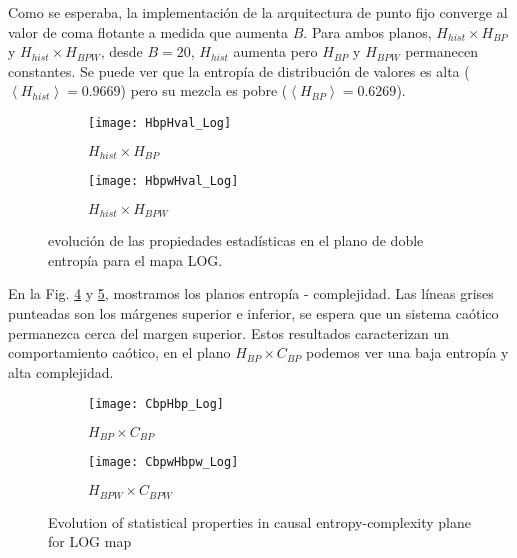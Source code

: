 Como se esperaba, la implementación de la arquitectura de punto fijo converge al valor de coma flotante a medida que aumenta $B$.
Para ambos planos, $H_{hist} \times H_{BP}$ y $H_{hist} \times H_{BPW}$, desde $B = 20$, $H_{hist}$ aumenta pero $H_{BP}$ y $H_{BPW}$ permanecen constantes.
Se puede ver que la entropía de distribución de valores es alta ($\left \langle H_{hist} \right \rangle = 0.9669$) pero su mezcla es pobre ($\left \langle H_{BP} \right \rangle = 0.6269$).
%
\begin{figure}[htpb]
	\centering
	\begin{subfigure}[b]{0.49\textwidth}
		\texttt{[image: HbpHval\_Log]}
		\caption{$H_{hist} \times H_{BP}$}
		\label{fig:HbpHval_Log}
	\end{subfigure}
	\begin{subfigure}[b]{0.49\textwidth}
		\texttt{[image: HbpwHval\_Log]}
		\caption{$H_{hist} \times H_{BPW}$}
		\label{fig:HbpwHval_Log}
	\end{subfigure}
	\caption{evolución de las propiedades estadísticas en el plano de doble entropía para el mapa LOG.}
	\label{fig:LOG_HH}
\end{figure}

En la Fig. \ref{fig:CbpHbp_Log} y \ref{fig:CbpwHbpw_Log}, mostramos los planos entropía - complejidad.
Las líneas grises punteadas son los márgenes superior e inferior, se espera que un sistema caótico permanezca cerca del margen superior.
Estos resultados caracterizan un comportamiento caótico, en el plano $H_{BP} \times C_{BP}$ podemos ver una baja entropía y alta complejidad.
%
\begin{figure}[htpb]
	\centering
	\begin{subfigure}[b]{0.49\textwidth}
		\texttt{[image: CbpHbp\_Log]}
		\caption{$H_{BP} \times C_{BP}$}
		\label{fig:CbpHbp_Log}
	\end{subfigure}
	\begin{subfigure}[b]{0.49\textwidth}
		\texttt{[image: CbpwHbpw\_Log]}
		\caption{$H_{BPW} \times C_{BPW}$}
		\label{fig:CbpwHbpw_Log}
	\end{subfigure}
	\caption{Evolution of statistical properties in causal entropy-complexity plane for LOG map}
	\label{fig:LOG_HC}
\end{figure}
